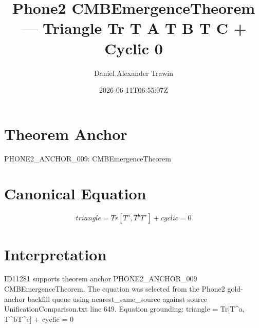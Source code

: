 \documentclass[11pt]{article}
\title{Phone2 CMBEmergenceTheorem — Triangle Tr T A T B T C + Cyclic 0}
\author{Daniel Alexander Trawin}
\date{2026-06-11T06:55:07Z}
\begin{document}
\maketitle
\section*{Theorem Anchor}
PHONE2_ANCHOR_009: CMBEmergenceTheorem
\section*{Canonical Equation}
\[
triangle = Tr[{T^a, T^b}T^c] + cyclic = 0
\]
\section*{Interpretation}
ID11281 supports theorem anchor PHONE2_ANCHOR_009 CMBEmergenceTheorem. The equation was selected from the Phone2 gold-anchor backfill queue using nearest_same_source against source UnificationComparison.txt line 649. Equation grounding: triangle = Tr[{T^a, T^b}T^c] + cyclic = 0
\end{document}
